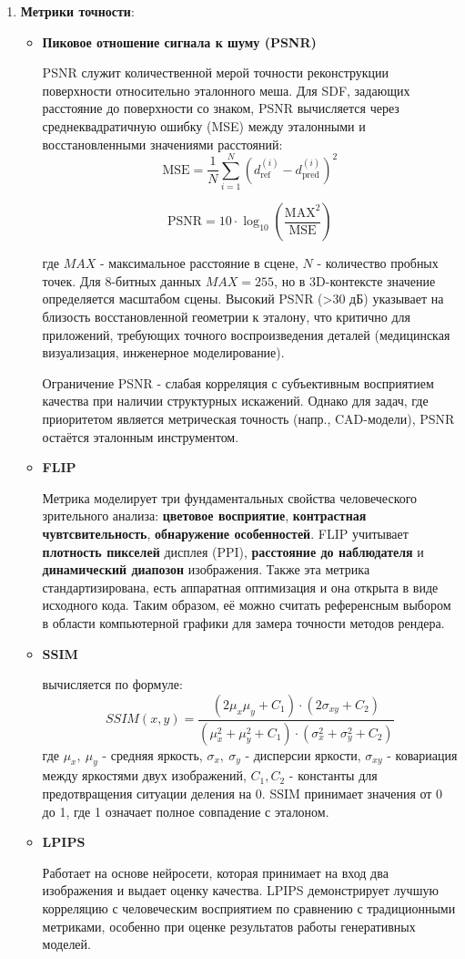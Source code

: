 \documentclass[a4paper,hidelinks,12pt]{article}
\begin{document}
\begin{enumerate}
	\item \textbf{Метрики точности}:
	
	\begin{itemize}
		\item \textbf{Пиковое отношение сигнала к шуму (PSNR)}
		\par
		PSNR служит количественной мерой точности реконструкции поверхности относительно эталонного меша. Для SDF, 
		задающих расстояние до поверхности со знаком, PSNR вычисляется через среднеквадратичную ошибку (MSE) между 
		эталонными и восстановленными значениями расстояний:
		$$
		\text{MSE} = \frac{1}{N} \sum_{i=1}^{N} (d_{\text{ref}}^{(i)} - d_{\text{pred}}^{(i)})^2
		$$
	
		$$
		\text{PSNR} = 10 \cdot \log_{10}\left(\frac{\text{MAX}^2}{\text{MSE}}\right)
		$$
	
		где $ MAX $ - максимальное расстояние в сцене, $ N $ - количество пробных точек. Для 8-битных данных 
		$ MAX = 255 $, но в 3D-контексте значение определяется масштабом сцены. Высокий PSNR (>30 дБ) 
		указывает на близость восстановленной геометрии к эталону, что критично для приложений, требующих точного 
		воспроизведения деталей (медицинская визуализация, инженерное моделирование).
		
		Ограничение PSNR - слабая корреляция с субъективным восприятием качества при наличии структурных искажений. 
		Однако для задач, где приоритетом является метрическая точность (напр., CAD-модели), PSNR остаётся эталонным инструментом.

		\item \textbf{FLIP}
		\par
		Метрика моделирует три фундаментальных свойства человеческого зрительного анализа: \textbf{цветовое восприятие}, \textbf{контрастная чувтсвительность},
		\textbf{обнаружение особенностей}. FLIP учитывает \textbf{плотность пикселей} дисплея (PPI), \textbf{расстояние до наблюдателя} и \textbf{динамический диапозон}
		изображения. Также эта метрика стандартизирована, есть аппаратная оптимизация и она открыта в виде исходного кода. Таким образом, её можно считать референсным выбором в области компьютерной графики
		для замера точности методов рендера.

		\item \textbf{SSIM}
		\par
		вычисляется по формуле: $$SSIM(x, y) = \frac{(2\mu_x\mu_y + C_1) \cdot (2\sigma_{xy} + C_2)}{(\mu_x^2 + \mu_y^2 + C_1) \cdot (\sigma_x^2 + \sigma_y^2 + C_2)}$$
		где $\mu_x, \ \mu_y$ - средняя яркость, $\sigma_x, \ \sigma_y$ - дисперсии яркости, $\sigma_{xy}$ - ковариация между яркостями двух изображений, $C_1, C_2$ - константы для предотвращения ситуации деления на 0.
		SSIM принимает значения от 0 до 1, где 1 означает полное совпадение с эталоном.
		\item \textbf{LPIPS}
		\par
		Работает на основе нейросети, которая принимает на вход два изображения и выдает оценку качества. LPIPS демонстрирует лучшую корреляцию с человеческим восприятием по сравнению с традиционными 
		метриками, особенно при оценке результатов работы генеративных моделей.


\end{itemize}
\end{enumerate}
\end{document}
